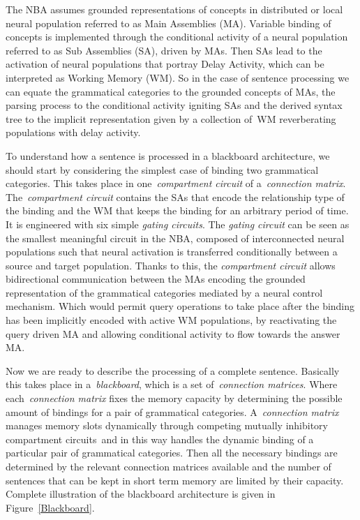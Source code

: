 \documentclass[10pt]{article}
\begin{document}
The NBA assumes grounded representations of concepts in distributed or
local neural population referred to as Main Assemblies (MA). Variable
binding of concepts is implemented through the conditional activity of a
neural population referred to as Sub Assemblies (SA), driven by MAs.
Then SAs lead to the activation of neural populations that portray Delay
Activity\cite{de_Kamps_2005}, which can be interpreted as Working Memory
(WM). So in the case of sentence processing we can equate the
grammatical categories to the grounded concepts of MAs, the parsing
process to the conditional activity igniting SAs and the derived syntax
tree to the implicit representation given by a collection of~WM
reverberating populations with delay activity.

To understand how a sentence is processed in a blackboard architecture,
we should start by considering the simplest case of binding two
grammatical categories. This takes place in one~\emph{compartment
circuit} of a~\emph{connection matrix}. The~\emph{compartment circuit}
contains the SAs that encode the relationship type of the binding and
the WM that keeps the binding for an arbitrary period of time. It is
engineered with six simple \emph{gating circuits}. The \emph{gating
circuit} can be seen as the smallest meaningful circuit in the NBA,
composed of interconnected neural populations such that neural
activation is transferred conditionally between a source and target
population. Thanks to this, the \emph{compartment circuit} allows
bidirectional communication between the MAs encoding the grounded
representation of the grammatical categories mediated by a neural
control mechanism. Which would permit query operations to take place
after the binding has been implicitly encoded with active WM
populations, by reactivating the query driven MA and allowing
conditional activity to flow towards the answer MA.

Now we are ready to describe the processing of a complete sentence.
Basically this takes place in a~\emph{blackboard}, which is a set
of~\emph{connection matrices}. Where each~\emph{connection matrix} fixes
the memory capacity by determining the possible amount of bindings for a
pair of grammatical categories. A~\emph{connection matrix} manages
memory slots dynamically through competing mutually inhibitory
compartment circuits~and in this way handles the dynamic binding of a
particular pair of grammatical categories. Then all the necessary
bindings are determined by the relevant connection matrices available
and the number of sentences that can be kept in short term memory are
limited by their capacity. Complete illustration of the blackboard
architecture is given in Figure~{\ref{Blackboard}}.
\end{document}

